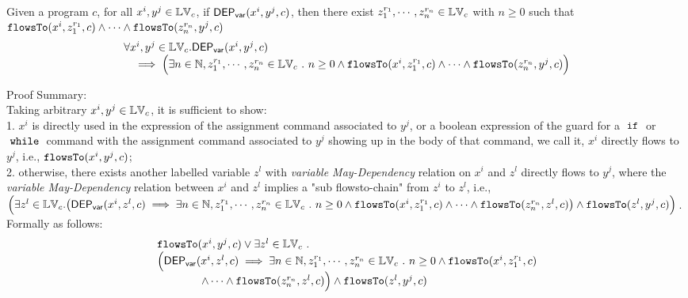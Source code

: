 \begin{thm}
\label{thm:flowsto_soundness}
Given a program ${c}$, for all  $ x^i, y^j \in \mathbb{LV}_{{c}}$, if $\mathsf{DEP_{var}}(x^i, y^j, {c})$,
then
there exist $z_1^{r_1}, \cdots, z_n^{r_n} \in \mathbb{LV}_{{c}}$ with $n \geq 0$ such that   
$\mathtt{flowsTo}(x^i,  z_1^{r_1}, c) 
\land \cdots \land \mathtt{flowsTo}(z_n^{r_n}, y^j, c)$
%
\[
\begin{array}{l}
  \forall x^i, y^j \in \mathbb{LV}_{{c}}.
  \mathsf{DEP_{var}}(x^i, y^j, {c})
  \\ \quad \implies
  \Big( \exists n \in \mathbb{N}, z_1^{r_1}, \cdots, z_n^{r_n} \in \mathbb{LV}_{{c}} ~.~ n \geq 0 \land
  \mathtt{flowsTo}(x^i,  z_1^{r_1}, c) 
  \land \cdots \land \mathtt{flowsTo}(z_n^{r_n}, y^j, c) \Big)
\end{array}
\]
\end{thm}
Proof Summary:
\\
Taking arbitrary $x^i, y^j \in \mathbb{LV}_c$,
  it is sufficient to show:
  \\
  1. $x^i$ is directly used in the expression of the assignment command associated to $y^j$, or a boolean
  expression of the guard for a $\;\mathtt{if}\;$ or $\;\mathtt{while}\;$ command with the assignment command associated to $y^j$ showing up in the body of that command, 
  we call it, $x^i$ directly flows to $y^j$,
  i.e.,
  $ \mathtt{flowsTo}(x^i, y^j, {c})$;
  \\
  2. otherwise, there exists another labelled variable $z^l$ with \emph{variable May-Dependency} relation on $x^i$ and 
  $z^l$ directly flows to $y^j$, where the \emph{variable May-Dependency} relation between $x^i$ and $z^l$
   implies a "sub flowsto-chain" from $z^i$ to $z^l$, 
  i.e., 
  \\
  $\Big(
    \exists z^l \in \lvar_{{c}}.
  \left(\vardep(x^i, z^l, {c})   
  \implies
   \exists n \in \mathbb{N}, z_1^{r_1}, \cdots, z_n^{r_n} \in \lvar_{{c}} \st n \geq 0 \land
  \flowsto(x^i,  z_1^{r_1}, c) 
  \land \cdots \land \flowsto(z_n^{r_n}, z^l, c)
  \right)
  \land  \flowsto(z^l, y^j, {c})
  \Big)$.
%
\\ Formally as follows:
\[
  \begin{array}{l}
    \mathtt{flowsTo}(x^i, y^j, {c})
    \lor 
      \exists z^l \in \mathbb{LV}_{{c}} ~.~
    \\
    \Big(
    \mathsf{DEP_{var}}(x^i, z^l, {c})   
  \implies
     \exists n \in \mathbb{N}, z_1^{r_1}, \cdots, z_n^{r_n} \in \mathbb{LV}_{{c}} ~.~ n \geq 0 \land
    \mathtt{flowsTo}(x^i,  z_1^{r_1}, c) 
    \\ \qquad \qquad 
    \land \cdots  \land \mathtt{flowsTo}(z_n^{r_n}, z^l, c) 
    \Big)
    \land  \mathtt{flowsTo}(z^l, y^j, {c})
  \end{array}
  \]
